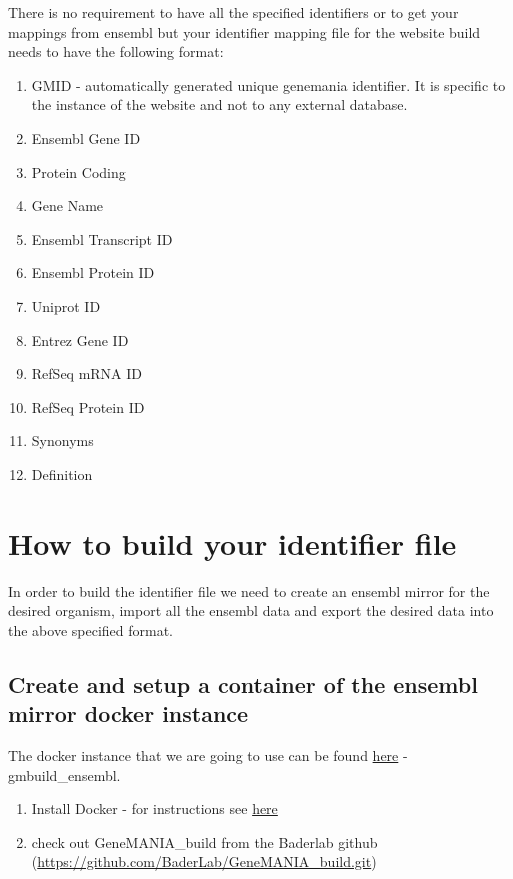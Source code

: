 \documentclass[]{book}
\providecommand{\tightlist}{%
  \setlength{\itemsep}{0pt}\setlength{\parskip}{0pt}}
\begin{document}
There is no requirement to have all the specified identifiers or to get
your mappings from ensembl but your identifier mapping file for the
website build needs to have the following format:

\begin{enumerate}
\def\labelenumi{\arabic{enumi}.}
\tightlist
\item
  GMID - automatically generated unique genemania identifier. It is
  specific to the instance of the website and not to any external
  database.
\item
  Ensembl Gene ID\\
\item
  Protein Coding
\item
  Gene Name\\
\item
  Ensembl Transcript ID\\
\item
  Ensembl Protein ID
\item
  Uniprot ID
\item
  Entrez Gene ID
\item
  RefSeq mRNA ID
\item
  RefSeq Protein ID\\
\item
  Synonyms\\
\item
  Definition
\end{enumerate}

\section{How to build your identifier
file}\label{how-to-build-your-identifier-file}

In order to build the identifier file we need to create an ensembl
mirror for the desired organism, import all the ensembl data and export
the desired data into the above specified format.

\subsection{Create and setup a container of the ensembl mirror docker
instance}\label{create-and-setup-a-container-of-the-ensembl-mirror-docker-instance}

The docker instance that we are going to use can be found
\href{https://hub.docker.com/repository/docker/baderlab/gmbuild_ensembl}{here}
- gmbuild\_ensembl.

\begin{enumerate}
\def\labelenumi{\arabic{enumi}.}
\tightlist
\item
  Install Docker - for instructions see
  \href{https://docs.docker.com/get-docker/}{here}
\item
  check out GeneMANIA\_build from the Baderlab github
  (\url{https://github.com/BaderLab/GeneMANIA_build.git})
\end{enumerate}
\end{document}
